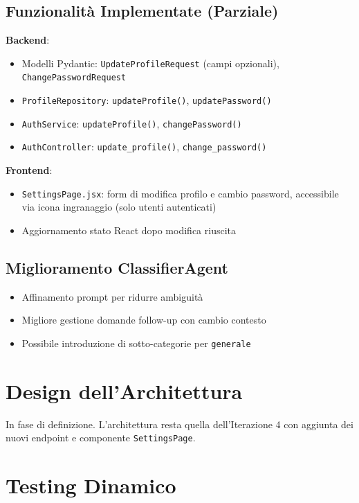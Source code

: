 \documentclass[a4paper,12pt]{report}
\begin{document}
\subsection{Funzionalità Implementate (Parziale)}

\textbf{Backend}:
\begin{itemize}
    \item Modelli Pydantic: \texttt{UpdateProfileRequest} (campi opzionali), \texttt{ChangePasswordRequest}
    \item \texttt{ProfileRepository}: \texttt{updateProfile()}, \texttt{updatePassword()}
    \item \texttt{AuthService}: \texttt{updateProfile()}, \texttt{changePassword()}
    \item \texttt{AuthController}: \texttt{update\_profile()}, \texttt{change\_password()}
\end{itemize}

\textbf{Frontend}:
\begin{itemize}
    \item \texttt{SettingsPage.jsx}: form di modifica profilo e cambio password, accessibile via icona ingranaggio (solo utenti autenticati)
    \item Aggiornamento stato React dopo modifica riuscita
\end{itemize}

\subsection{Miglioramento ClassifierAgent}

\begin{itemize}
    \item Affinamento prompt per ridurre ambiguità
    \item Migliore gestione domande follow-up con cambio contesto
    \item Possibile introduzione di sotto-categorie per \texttt{generale}
\end{itemize}

\section{Design dell'Architettura}

In fase di definizione. L'architettura resta quella dell'Iterazione 4 con aggiunta dei nuovi endpoint e componente \texttt{SettingsPage}.

\section{Testing Dinamico}
\end{document}
